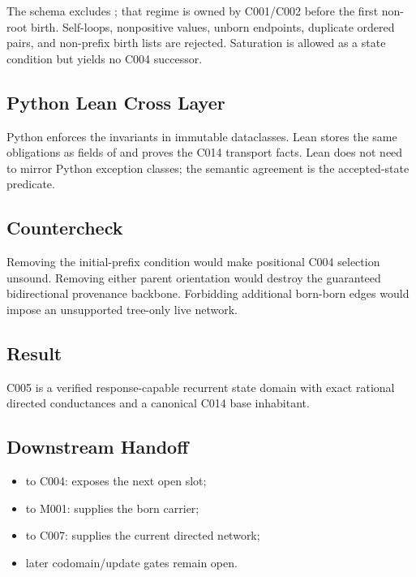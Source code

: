 The schema excludes \texttt{\protect{}}; that regime is owned by C001/C002
before the first non-root birth. Self-loops, nonpositive values, unborn
endpoints, duplicate ordered pairs, and non-prefix birth lists are
rejected. Saturation is allowed as a state condition but yields no C004
successor.

\subsection{Python Lean Cross Layer}\label{python-lean-cross-layer-5}

Python enforces the invariants in immutable dataclasses. Lean stores the
same obligations as fields of \texttt{\protect{}} and proves
the C014 transport facts. Lean does not need to mirror Python exception
classes; the semantic agreement is the accepted-state predicate.

\subsection{Countercheck}\label{countercheck-5}

Removing the initial-prefix condition would make positional C004
selection unsound. Removing either parent orientation would destroy the
guaranteed bidirectional provenance backbone. Forbidding additional
born-born edges would impose an unsupported tree-only live network.

\subsection{Result}\label{result-14}

C005 is a verified response-capable recurrent state domain with exact
rational directed conductances and a canonical C014 base inhabitant.

\subsection{Downstream Handoff}\label{downstream-handoff-14}

\begin{itemize}
\tightlist
\item
  \texttt{\protect{}} to C004: exposes the next open slot;
\item
  \texttt{\protect{}} to M001: supplies the born carrier;
\item
  \texttt{\protect{}} to C007: supplies the current directed network;
\item
  later codomain/update gates remain open.
\end{itemize}

